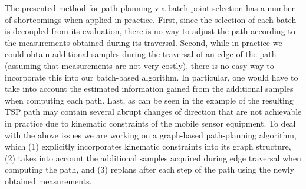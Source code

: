 The presented method for path planning via batch point selection has
a number of shortcomings when applied in practice.
First, since the selection of each batch is decoupled from its evaluation,
there is no way to adjust the path according to the measurements obtained
during its traversal.
Second, while in practice we could obtain additional samples during the
traversal of an edge of the path (assuming that measurements are not
very costly), there is no easy way to incorporate this into our batch-based
algorithm. In particular, one would have to take into account the
estimated information gained from the additional samples when computing
each path.
Last, as can be seen in the example of 
the resulting TSP path may contain several abrupt changes of direction that
are not achievable in practice due to kinematic constraints of the mobile
sensor equipment.
To deal with the above issues we are working on a graph-based
path-planning algorithm, which (1) explicitly incorporates kinematic
constraints into its graph structure, (2) takes into account the additional
samples acquired during edge traversal when computing the path,
and (3) replans after each step of the path using the newly obtained
measurements.


